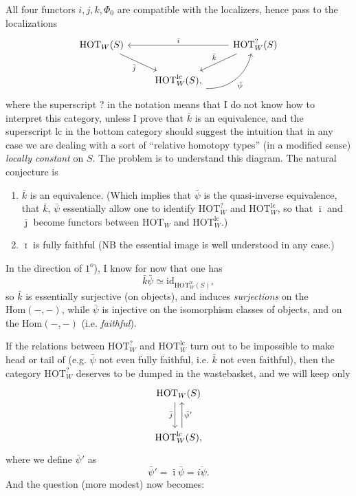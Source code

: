 All four functors $i, j, k, \Phi_0$ are compatible with the localizers, hence pass to the localizations
\[
\begin{tikzcd}
\mathrm{HOT}_W(S) \arrow[dr, "\bar{j}"'] & & \mathrm{HOT}^{?}_W(S) \arrow[ll, "\bar{\imath}"'] \arrow[dl, "\bar{k}"'] \\
& \mathrm{HOT}^{\mathrm{lc}}_W(S), \arrow[ur, bend right=40, "\bar{\psi}"'] &
\end{tikzcd}
\]
where the superscript ? in the notation means that I do not know how to interpret this category, unless I prove that $\bar{k}$ is an equivalence, and the superscript lc in the bottom category should suggest the intuition that in any case we are dealing with a sort of ``relative homotopy types'' (in a modified sense) \textit{locally constant} on $S$. The problem is to understand this diagram. The natural conjecture is %

\begin{enumerate}[leftmargin=*]
\item[$1^o$)] $\bar{k}$ is an equivalence. (Which implies that $\bar{\psi}$ is the quasi-inverse equivalence, that $\bar{k}$, $\bar{\psi}$ essentially allow one to identify $\mathrm{HOT}^{?}_W$ and $\mathrm{HOT}^{\mathrm{lc}}_W$, so that $\bar{\imath}$ and $\bar{\jmath}$ become functors between $\mathrm{HOT}_W$ and $\mathrm{HOT}^{\mathrm{lc}}_W$.)

\item[$2^o$)] $\bar{\imath}$ is fully faithful (NB the essential image is well understood in any case.)
\end{enumerate}

In the direction of $1^o$), I know for now that one has
\[
\bar{k}\bar{\psi} \simeq \mathrm{id}_{\mathrm{HOT}^{\mathrm{lc}}_W(S)},
\]
so $\bar{k}$ is essentially surjective (on objects), and induces \textit{surjections} on the $\mathrm{Hom}(-,-)$, while $\bar{\psi}$ is injective on the isomorphism classes of objects, and on the $\mathrm{Hom}(-,-)$ (i.e. \textit{faithful}).

If the relations between $\mathrm{HOT}^{?}_W$ and $\mathrm{HOT}^{\mathrm{lc}}_W$ turn out to be impossible to make head or tail of (e.g. $\bar{\psi}$ not even fully faithful, i.e. $\bar{k}$ not even faithful), then the category $\mathrm{HOT}^{?}_W$ deserves to be dumped in the wastebasket, and we will keep only
\[
\begin{tikzcd}[row sep=large]
\mathrm{HOT}_W(S) \arrow[d, shift right=1.5, "\bar{j}"'] \\
\mathrm{HOT}^{\mathrm{lc}}_W(S), \arrow[u, shift right=1.5, "\bar{\psi}'"']
\end{tikzcd}
\]
where we define $\bar{\psi}'$ as
\[
\bar{\psi}' = \bar{\imath}\bar{\psi} = \overline{i\psi}.
\]
And the question (more modest) now becomes:

